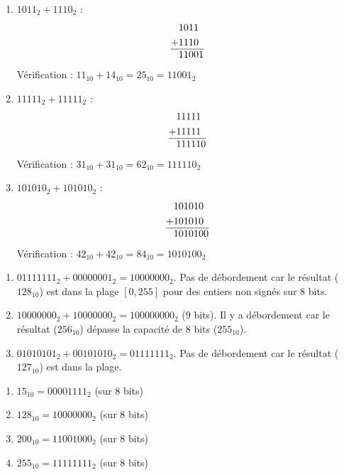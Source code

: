 \begin{enumerate}
    \item $1011_2 + 1110_2$ :
    \begin{align*}
        &1011\\
        +&1110\\
        \hline
        &11001
    \end{align*}
    Vérification : $11_{10} + 14_{10} = 25_{10} = 11001_2$
    
    \item $11111_2 + 11111_2$ :
    \begin{align*}
        &11111\\
        +&11111\\
        \hline
        &111110
    \end{align*}
    Vérification : $31_{10} + 31_{10} = 62_{10} = 111110_2$
    
    \item $101010_2 + 101010_2$ :
    \begin{align*}
        &101010\\
        +&101010\\
        \hline
        &1010100
    \end{align*}
    Vérification : $42_{10} + 42_{10} = 84_{10} = 1010100_2$
\end{enumerate}

\begin{enumerate}
    \item $01111111_2 + 00000001_2 = 10000000_2$. Pas de débordement car le résultat ($128_{10}$) est dans la plage $[0, 255]$ pour des entiers non signés sur 8 bits.
    \item $10000000_2 + 10000000_2 = 100000000_2$ (9 bits). Il y a débordement car le résultat ($256_{10}$) dépasse la capacité de 8 bits ($255_{10}$).
    \item $01010101_2 + 00101010_2 = 01111111_2$. Pas de débordement car le résultat ($127_{10}$) est dans la plage.
\end{enumerate}

\begin{enumerate}
    \item $15_{10} = 00001111_2$ (sur 8 bits)
    \item $128_{10} = 10000000_2$ (sur 8 bits)
    \item $200_{10} = 11001000_2$ (sur 8 bits)
    \item $255_{10} = 11111111_2$ (sur 8 bits)
\end{enumerate}

